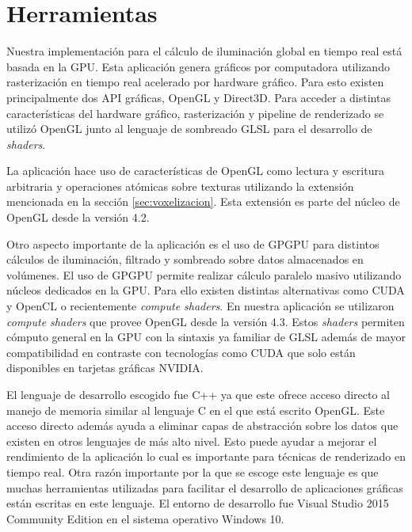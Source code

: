\section{Herramientas}
Nuestra implementación para el cálculo de iluminación global en tiempo real está basada en la \ac{GPU}. Esta aplicación genera gráficos por computadora utilizando rasterización en tiempo real acelerado por hardware gráfico. Para esto existen principalmente dos API gráficas, OpenGL y Direct3D. Para acceder a distintas características del hardware gráfico, rasterización y pipeline de renderizado se utilizó OpenGL junto al lenguaje de sombreado GLSL para el desarrollo de \emph{shaders}. 

La aplicación hace uso de características de OpenGL como lectura y escritura arbitraria y operaciones atómicas sobre texturas utilizando la extensión mencionada en la sección \ref{sec:voxelizacion}. Esta extensión es parte del núcleo de OpenGL desde la versión 4.2. 

Otro aspecto importante de la aplicación es el uso de \ac{GPGPU} para distintos cálculos de iluminación, filtrado y sombreado sobre datos almacenados en volúmenes. El uso de \ac{GPGPU} permite realizar cálculo paralelo masivo utilizando núcleos dedicados en la \ac{GPU}. Para ello existen distintas alternativas como CUDA y OpenCL o recientemente \emph{compute shaders}. En nuestra aplicación se utilizaron \emph{compute shaders} que provee OpenGL desde la versión 4.3. Estos \emph{shaders} permiten cómputo general en la GPU con la sintaxis ya familiar de GLSL además de mayor compatibilidad en contraste con tecnologías como CUDA que solo están disponibles en tarjetas gráficas NVIDIA.

El lenguaje de desarrollo escogido fue C++ ya que este ofrece acceso directo al manejo de memoria similar al lenguaje C en el que está escrito OpenGL. Este acceso directo además ayuda a eliminar capas de abstracción sobre los datos que existen en otros lenguajes de más alto nivel. Esto puede ayudar a mejorar el rendimiento de la aplicación lo cual es importante para técnicas de renderizado en tiempo real. Otra razón importante por la que se escoge este lenguaje es que muchas herramientas utilizadas para facilitar el desarrollo de aplicaciones gráficas están escritas en este lenguaje. El entorno de desarrollo fue Visual Studio 2015 Community Edition en el sistema operativo Windows 10.

